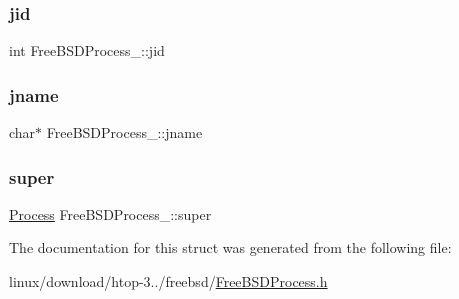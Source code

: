 \subsubsection{\texorpdfstring{jid}{jid}}
{\footnotesize\ttfamily int Free\+B\+S\+D\+Process\+\_\+\+::jid}

\mbox{\label{structFreeBSDProcess___adc489d24793e796a15a1ac366019473f}} 
\subsubsection{\texorpdfstring{jname}{jname}}
{\footnotesize\ttfamily char$\ast$ Free\+B\+S\+D\+Process\+\_\+\+::jname}

\mbox{\label{structFreeBSDProcess___a28b04896c569314268391d2cbfa36a87}} 
\subsubsection{\texorpdfstring{super}{super}}
{\footnotesize\ttfamily \hyperlink{Process_8h_a20673e8fa40981a168bf0e196c4cef3b}{Process} Free\+B\+S\+D\+Process\+\_\+\+::super}



The documentation for this struct was generated from the following file\+:\begin{DoxyCompactItemize}
\item 
linux/download/htop-\/3../freebsd/\hyperlink{FreeBSDProcess_8h}{Free\+B\+S\+D\+Process.\+h}\end{DoxyCompactItemize}
